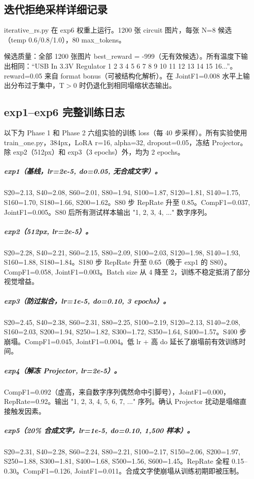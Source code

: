 \subsection{迭代拒绝采样详细记录}

iterative\_rs.py 在 exp6 权重上运行。1200 张 circuit 图片，每张 N=8 候选（temp 0.6/0.8/1.0），80 max\_tokens。

候选质量：全部 1200 张图片 best\_reward = -999（无有效候选）。所有温度下输出相同：``USB In 3.3V Regulator 1 2 3 4 5 6 7 8 9 10 11 12 13 14 15 16...''。reward=0.05 来自 format bonus（可被结构化解析）。在 JointF1=0.008 水平上输出分布过于集中，T$>$0 时仍退化到相同塌缩状态输出。

\subsection{exp1--exp6 完整训练日志}

以下为 Phase 1 和 Phase 2 六组实验的训练 loss（每 40 步采样）。所有实验使用 train\_one.py，384px，LoRA r=16, alpha=32, dropout=0.05，冻结 Projector。除 exp2（512px）和 exp3（3 epochs）外，均为 2 epochs。

\subparagraph{exp1（基线，lr=2e-5, do=0.05, 无合成文字）。}
S20=2.13, S40=2.08, S60=2.01, S80=1.94, S100=1.87, S120=1.81, S140=1.75, S160=1.70, S180=1.66, S200=1.62。S80 步 RepRate 升至 0.85。CompF1=0.037, JointF1=0.005。S80 后所有测试样本输出 "1, 2, 3, 4, ..." 数字序列。

\subparagraph{exp2（512px, lr=2e-5）。}
S20=2.28, S40=2.21, S60=2.15, S80=2.09, S100=2.03, S120=1.98, S140=1.93, S160=1.88, S180=1.84。S180 步 RepRate 升至 0.65（晚于 exp1 的 S80）。CompF1=0.058, JointF1=0.003。Batch size 从 4 降至 2，训练不稳定抵消了部分视觉增益。

\subparagraph{exp3（防过拟合，lr=1e-5, do=0.10, 3 epochs）。}
S20=2.45, S40=2.38, S60=2.31, S80=2.25, S100=2.19, S120=2.13, S140=2.08, S160=2.03, S200=1.94, S250=1.82, S300=1.72, S350=1.64, S400=1.57。S400 步崩塌。CompF1=0.045, JointF1=0.004。低 lr + 高 do 延长了崩塌前有效训练时间。

\subparagraph{exp4（解冻 Projector, lr=2e-5）。}
CompF1=0.092（虚高，来自数字序列偶然命中引脚号），JointF1=0.000，RepRate=0.92。输出 "1, 2, 3, 4, 5, 6, 7, ..." 序列。确认 Projector 扰动是塌缩直接触发因素。

\subparagraph{exp5（20\% 合成文字，lr=1e-5, do=0.10, 1,500 样本）。}
S20=2.31, S40=2.28, S60=2.24, S80=2.21, S100=2.17, S150=2.06, S200=1.97, S250=1.88, S300=1.81, S400=1.68, S500=1.56, S600=1.45。RepRate 全程 0.15--0.30。CompF1=0.126, JointF1=0.011。合成文字使崩塌从训练初期即被压制。

